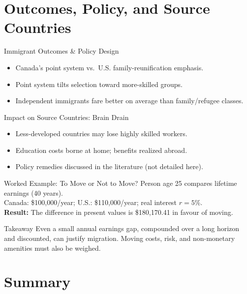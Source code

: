 \documentclass[aspectratio=169]{beamer}
\begin{document}
\section{Outcomes, Policy, and Source Countries}

\begin{frame}{Immigrant Outcomes \& Policy Design}
\transfade
\begin{itemize}[<+->]
  \item Canada’s point system vs.\ U.S. family-reunification emphasis.
  \item Point system tilts selection toward more-skilled groups.
  \item Independent immigrants fare better on average than family/refugee classes.
\end{itemize}
\end{frame}

\begin{frame}{Impact on Source Countries: Brain Drain}
\transfade
\begin{itemize}[<+->]
  \item Less-developed countries may lose highly skilled workers.
  \item Education costs borne at home; benefits realized abroad.
  \item Policy remedies discussed in the literature (not detailed here).
\end{itemize}
\end{frame}

\begin{frame}{Worked Example: To Move or Not to Move?}
\transfade
\small
Person age 25 compares lifetime earnings (40 years).\\
Canada: \$100{,}000/year; U.S.: \$110{,}000/year; real interest \(r=5\%\).\\
\textbf{Result:} The difference in present values is \$180{,}170.41 in favour of moving.\\[0.5em]
\begin{block}{Takeaway}
Even a small annual earnings gap, compounded over a long horizon and discounted, can justify migration. Moving costs, risk, and non-monetary amenities must also be weighed.
\end{block}
\end{frame}

\section{Summary}
\end{document}
